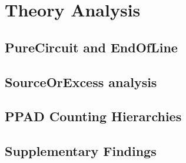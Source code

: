 \chapter{Theory Analysis}
\label{chap:findings}





\section{PureCircuit and EndOfLine}
\label{sec:pc-plus-eol}


\section{SourceOrExcess analysis}
\label{sec:sc-excess}



\section{PPAD Counting Hierarchies}



\section{Supplementary Findings}
\label{sec:chap-3:supp-findings}




% 
